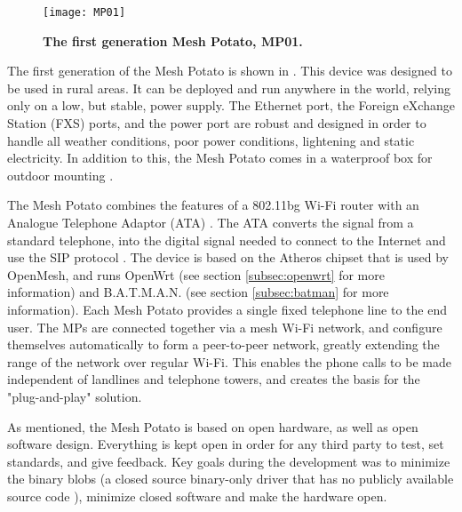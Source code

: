 \begin{figure}[b]
  \centering
      \texttt{[image: MP01]}
  \caption [MP01]{\textbf{The first generation Mesh Potato, MP01.}}
  \label{fig:MP01}
\end{figure}

The first generation of the Mesh Potato is shown in . This device was designed to be used in rural areas. It can be deployed and run anywhere in the world, relying only on a low, but stable, power supply. The Ethernet port, the Foreign eXchange Station (FXS) ports, and the power port are robust and designed in order to handle all weather conditions, poor power conditions, lightening and static electricity. In addition to this, the Mesh Potato comes in a waterproof box for outdoor mounting \cite{background}.

The Mesh Potato combines the features of a 802.11bg Wi-Fi router with an Analogue Telephone Adaptor (ATA) \cite{MP}. The ATA converts the signal from a standard telephone, into the digital signal needed to connect to the Internet and use the SIP protocol \cite{MParticle}. The device is based on the Atheros chipset that is used by OpenMesh, and runs OpenWrt (see section \ref{subsec:openwrt} for more information) and B.A.T.M.A.N. (see section \ref{subsec:batman} for more information). Each Mesh Potato provides a single fixed telephone line to the end user. The MPs are connected together via a mesh Wi-Fi network, and configure themselves automatically to form a peer-to-peer network, greatly extending the range of the network over regular Wi-Fi. This enables the phone calls to be made independent of landlines and telephone towers, and creates the basis for the "plug-and-play" solution. 

As mentioned, the Mesh Potato is based on open hardware, as well as open software design. Everything is kept open in order for any third party to test, set standards, and give feedback. Key goals during the development was to minimize the binary blobs (a closed source binary-only driver that has no publicly available source code \cite{binaryBolb}), minimize closed software and make the hardware open. 

